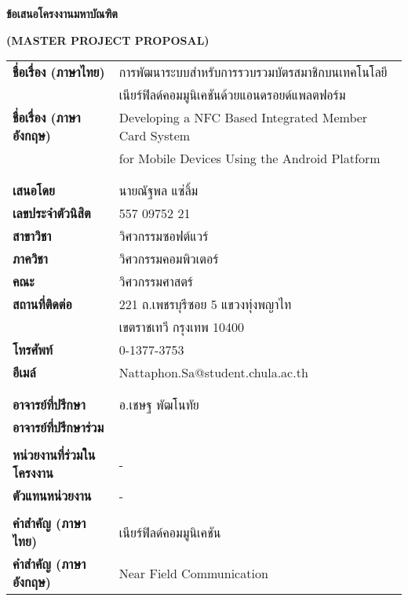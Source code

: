 \documentclass[a4paper]{article}
\begin{document}

\begin{center}
{\huge \bf ข้อเสนอโครงงานมหาบัณฑิต} 
\end{center}

\begin{center}
{\huge \bf (MASTER PROJECT PROPOSAL)} 
\end{center}

\vspace{1cm}
\Large{\noindent\hspace{0.2cm}\setlength{\tabcolsep}{15pt}
\begin{tabular}{l l}    
	\bf ชื่อเรื่อง (ภาษาไทย) 		& การพัฒนาระบบสำหรับการรวบรวมบัตรสมาชิกบนเทคโนโลยี \\
							& เนียร์ฟิลด์คอมมูนิเคชันด้วยแอนดรอยด์แพลตฟอร์ม \\
	\bf ชื่อเรื่อง (ภาษาอังกฤษ)		& Developing a NFC Based Integrated Member Card System \\
							& for Mobile Devices Using the Android Platform \\ 
							& \\
							& \\
	\bf เสนอโดย				& นายณัฐพล แซ่ลิ้ม \\
	\bf เลขประจำตัวนิสิต			& 557 09752 21 \\
	\bf สาขาวิชา				& วิศวกรรมซอฟต์แวร์ \\
	\bf ภาควิชา				& วิศวกรรมคอมพิวเตอร์ \\
	\bf คณะ					& วิศวกรรมศาสตร์ \\
	\bf สถานที่ติดต่อ				& 221 ถ.เพชรบุรีซอย 5 แขวงทุ่งพญาไท \\
							& เขตราชเทวี กรุงเทพ 10400 \\
	\bf โทรศัพท์				& 0-1377-3753 \\
	\bf อีเมล์					&  Nattaphon.Sa@student.chula.ac.th \\
							& \\
							& \\
	\bf อาจารย์ที่ปรึกษา			& อ.เชษฐ พัฒโนทัย \\
	\bf อาจารย์ที่ปรึกษาร่วม		& \\
							& \\
	\bf หน่วยงานที่ร่วมในโครงงาน	& - \\
	\bf ตัวแทนหน่วยงาน			& - \\
							& \\
	\bf คำสำคัญ (ภาษาไทย)		& เนียร์ฟิลด์คอมมูนิเคชัน \\
	\bf คำสำคัญ (ภาษาอังกฤษ)		& Near Field Communication \\
\end{tabular}
}
\end{document}
